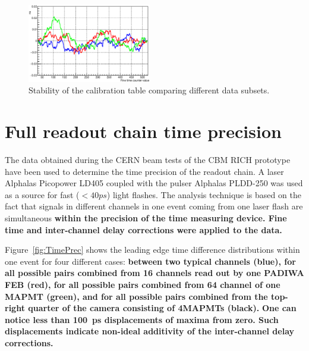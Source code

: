 \documentclass[final,5p,times,twocolumn]{elsarticle}
\begin{document}
\begin{figure}[h]
	\centering
	\includegraphics[width=0.48\textwidth]{figures/Stability_01_diff.eps}
	\caption{Stability of the calibration table comparing different data subsets.}
	\label{fig:CalibStability}
\end{figure}


\section{Full readout chain time precision}

The data obtained during the CERN beam tests of the CBM RICH prototype have been used to determine the time precision of the readout chain. A laser Alphalas Picopower LD405 coupled with the pulser Alphalas PLDD-250 \cite{LASER} was used as a source for fast ($<40ps$) light flashes. The analysis technique is based on the fact that signals in different channels in one event coming from one laser flash are simultaneous \textbf{within the precision of the time measuring device. Fine time and inter-channel delay corrections were applied to the data.}


Figure~\ref{fig:TimePrec} shows the leading edge time difference distributions within one event for four different cases:
\textbf{between two typical channels (blue), for all possible pairs combined from 16 channels read out by one PADIWA FEB (red), for all possible pairs combined from 64 channel of one MAPMT (green), and  for all possible pairs combined from the top-right quarter of the camera consisting of 4MAPMTs (black).}
\textbf{One can notice less than 100~ps displacements of maxima from zero. Such displacements indicate non-ideal additivity of the inter-channel delay corrections.}
\end{document}
